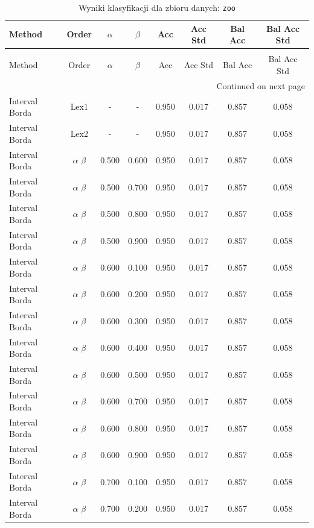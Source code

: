 \begin{longtable}{lccccccc}
\caption{Wyniki klasyfikacji dla zbioru danych: \texttt{zoo} } \label{tab:results_zoo} \\
\toprule
Method & Order & $\alpha$ & $\beta$ & Acc & Acc Std & Bal Acc & Bal Acc Std \\
\midrule
\endfirsthead
\caption[]{Wyniki klasyfikacji dla zbioru danych: \texttt{zoo} } \\
\toprule
Method & Order & $\alpha$ & $\beta$ & Acc & Acc Std & Bal Acc & Bal Acc Std \\
\midrule
\endhead
\midrule
\multicolumn{8}{r}{Continued on next page} \\
\midrule
\endfoot
\bottomrule
\endlastfoot
Interval Borda & Lex1 & - & - & 0.950 & 0.017 & 0.857 & 0.058 \\
Interval Borda & Lex2 & - & - & 0.950 & 0.017 & 0.857 & 0.058 \\
Interval Borda & $\alpha$ $\beta$ & 0.500 & 0.600 & 0.950 & 0.017 & 0.857 & 0.058 \\
Interval Borda & $\alpha$ $\beta$ & 0.500 & 0.700 & 0.950 & 0.017 & 0.857 & 0.058 \\
Interval Borda & $\alpha$ $\beta$ & 0.500 & 0.800 & 0.950 & 0.017 & 0.857 & 0.058 \\
Interval Borda & $\alpha$ $\beta$ & 0.500 & 0.900 & 0.950 & 0.017 & 0.857 & 0.058 \\
Interval Borda & $\alpha$ $\beta$ & 0.600 & 0.100 & 0.950 & 0.017 & 0.857 & 0.058 \\
Interval Borda & $\alpha$ $\beta$ & 0.600 & 0.200 & 0.950 & 0.017 & 0.857 & 0.058 \\
Interval Borda & $\alpha$ $\beta$ & 0.600 & 0.300 & 0.950 & 0.017 & 0.857 & 0.058 \\
Interval Borda & $\alpha$ $\beta$ & 0.600 & 0.400 & 0.950 & 0.017 & 0.857 & 0.058 \\
Interval Borda & $\alpha$ $\beta$ & 0.600 & 0.500 & 0.950 & 0.017 & 0.857 & 0.058 \\
Interval Borda & $\alpha$ $\beta$ & 0.600 & 0.700 & 0.950 & 0.017 & 0.857 & 0.058 \\
Interval Borda & $\alpha$ $\beta$ & 0.600 & 0.800 & 0.950 & 0.017 & 0.857 & 0.058 \\
Interval Borda & $\alpha$ $\beta$ & 0.600 & 0.900 & 0.950 & 0.017 & 0.857 & 0.058 \\
Interval Borda & $\alpha$ $\beta$ & 0.700 & 0.100 & 0.950 & 0.017 & 0.857 & 0.058 \\
Interval Borda & $\alpha$ $\beta$ & 0.700 & 0.200 & 0.950 & 0.017 & 0.857 & 0.058 \\

\end{longtable}
